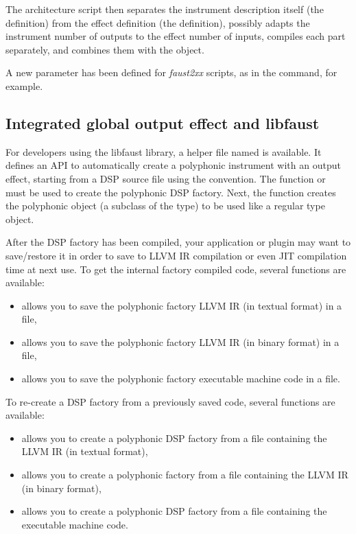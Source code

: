 The architecture script then separates the instrument description itself (the  definition) from the effect definition (the   definition), possibly adapts the instrument number of outputs to the effect number of inputs, compiles each part separately, and combines them with the  object.

A new  parameter has been defined for {\it faust2xx} scripts, as in the  command, for example.

\subsection{Integrated global output effect and libfaust}

For developers using the libfaust library, a helper file named  is available. It defines an API to automatically create a polyphonic instrument with an output effect, starting from a DSP source file using the   convention. The function  or  \\  must be used to create the polyphonic DSP factory. Next, the  function creates the polyphonic object (a subclass of the  type) to be used like a regular  type object. 

After the DSP factory has been compiled, your application or plugin may want to save/restore it in order to save \faust to LLVM IR compilation or even JIT compilation time at next use. To get the internal factory compiled code, several functions are available:

\begin{itemize}
\item {} allows you to save the polyphonic factory LLVM IR (in textual format) in a file,
\item {} allows you to save the polyphonic factory LLVM IR (in binary format) in a file,
\item {} allows you to save the polyphonic factory executable machine code in a file.
\end{itemize}

To re-create a DSP factory from a previously saved code, several functions are available:

\begin{itemize}
\item {} allows you to create a polyphonic DSP factory from a file containing the LLVM IR (in textual format),
\item {} allows you to create a polyphonic  factory from a file containing the LLVM IR (in binary format),
\item {} allows you to create a polyphonic DSP factory from a file containing the executable machine code.
\end{itemize}
